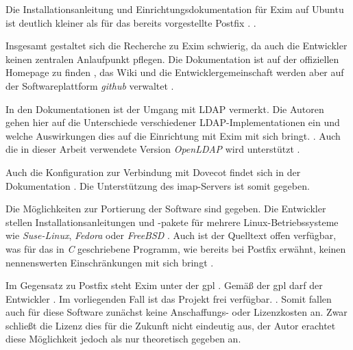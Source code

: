 Die Installationsanleitung und Einrichtungsdokumentation für Exim auf Ubuntu ist deutlich kleiner als für das bereits vorgestellte Postfix \citep[vgl.][]{eximubuntu}.  \citep[][]{eximubuntu}. 

Insgesamt gestaltet sich die Recherche zu Exim schwierig, da auch die Entwickler keinen zentralen Anlaufpunkt pflegen. Die Dokumentation ist auf der offiziellen Homepage zu finden \citep[vgl.][]{eximdoku}, das Wiki und die Entwicklergemeinschaft werden aber auf der Softwareplattform \textit{github} verwaltet \citep[vgl.][]{eximwiki}. 

In den Dokumentationen ist der Umgang mit LDAP vermerkt. Die Autoren gehen hier auf die Unterschiede verschiedener LDAP-Implementationen ein und welche Auswirkungen dies auf die Einrichtung mit Exim mit sich bringt.  \citep[][14.]{eximldap}. Auch die in dieser Arbeit verwendete Version \textit{OpenLDAP} wird unterstützt \citep[vgl.][14.]{eximldap}.

Auch die Konfiguration zur Verbindung mit Dovecot findet sich in der Dokumentation \citep[vgl.][]{eximdovecot}. Die Unterstützung des \ac{imap}-Servers ist somit gegeben.

Die Möglichkeiten zur Portierung der Software sind gegeben. Die Entwickler stellen Installationsanleitungen und -pakete für mehrere Linux-Betriebssysteme wie \textit{Suse-Linux}, \textit{Fedora} oder \textit{FreeBSD} \citep[vgl.][]{eximinstall}. 
Auch ist der Quelltext offen verfügbar, was für das in \textit{C} geschriebene Programm, wie bereits bei Postfix erwähnt, keinen nennenswerten Einschränkungen mit sich bringt \citep[vgl.][]{eximgit}. 

Im Gegensatz zu Postfix steht Exim unter der \ac{gpl} \citep[vgl.][]{eximhome}. Gemäß der \ac{gpl} darf der Entwickler  \citep[][4. Unveränderte Kopien]{gpldeutsch}. Im vorliegenden Fall ist das Projekt frei verfügbar.  \citep[][]{eximhome}.
Somit fallen auch für diese Software zunächst keine Anschaffungs- oder Lizenzkosten an. Zwar schließt die Lizenz dies für die Zukunft nicht eindeutig aus, der Autor erachtet diese Möglichkeit jedoch als nur theoretisch gegeben an. 

